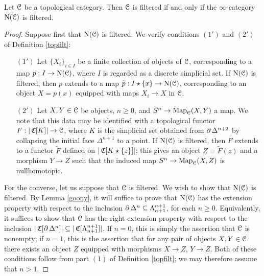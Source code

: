 \begin{proposition}\label{stook}
Let $\operatorname{\mathcal{C}}$ be a topological category. Then $\operatorname{\mathcal{C}}$ is filtered if and only if the $\infty$-category
$\operatorname{N}(\operatorname{\mathcal{C}})$ is filtered.
\end{proposition}

\begin{proof}
Suppose first that $\operatorname{N}(\operatorname{\mathcal{C}})$ is filtered. We verify conditions $(1')$ and $(2')$ of Definition \ref{topfilt}:

\begin{itemize}
\item[$(1')$] Let $\{X_i\}_{i \in I}$ be a finite collection of
objects of $\operatorname{\mathcal{C}}$, corresponding to a map $p: I \rightarrow \operatorname{N}(\operatorname{\mathcal{C}})$, where $I$ is regarded as a discrete simplicial set. If $\operatorname{N}(\operatorname{\mathcal{C}})$ is filtered, then $p$ extends to a map
$\widetilde{p}: I \star \{x\} \rightarrow \operatorname{N}(\operatorname{\mathcal{C}})$, corresponding to an object $X = p(x)$
equipped with maps $X_i \rightarrow X$ in $\operatorname{\mathcal{C}}$.

\item[$(2')$] Let $X, Y \in \operatorname{\mathcal{C}}$ be objects, $n \geq 0$, and $S^n \rightarrow \operatorname{{Map}}_{\operatorname{\mathcal{C}}}(X,Y)$ a map. We note that this data may be identified with a topological functor $F: | \operatorname{\mathfrak{C}}[K] | \rightarrow \operatorname{\mathcal{C}}$, where $K$ is the simplicial set obtained from $\operatorname{\partial} \Delta^{n+2}$ by collapsing the initial face
$\Delta^{n+1}$ to a point. If $\operatorname{N}(\operatorname{\mathcal{C}})$ is filtered, then $F$ extends to a functor $\widetilde{F}$ defined on $| \operatorname{\mathfrak{C}}[ K \star \{z\}] |$; this gives an object $Z = \widetilde{F}(z)$ and a morphism
$Y \rightarrow Z$ such that the induced map $S^n \rightarrow \operatorname{{Map}}_{\operatorname{\mathcal{C}}}(X,Z)$ is nullhomotopic.
\end{itemize}

For the converse, let us suppose that $\operatorname{\mathcal{C}}$ is filtered. We wish to show that $\operatorname{N}(\operatorname{\mathcal{C}})$ is filtered. By Lemma \ref{goony}, it will suffice to prove that $\operatorname{N}(\operatorname{\mathcal{C}})$ has the extension property with respect to the inclusion $\operatorname{\partial} \Delta^n \subseteq \Lambda^{n+1}_{n+1}$, for each $n \geq 0$. Equivalently, it suffices to show that $\operatorname{\mathcal{C}}$ has the right extension property with
respect to the inclusion $| \operatorname{\mathfrak{C}}[ \operatorname{\partial} \Delta^n] | \subseteq | \operatorname{\mathfrak{C}}[ \Lambda^{n+1}_{n+1} ] |$.
If $n = 0$, this is simply the assertion that $\operatorname{\mathcal{C}}$ is nonempty; if $n = 1$, this is the assertion that for any pair of objects $X,Y \in \operatorname{\mathcal{C}}$ there exists an object $Z$ equipped with morphisms
$X \rightarrow Z$, $Y \rightarrow Z$. Both of these conditions follow from part $(1)$ of Definition \ref{topfilt}; we may therefore assume that $n > 1$.


\end{proof}
